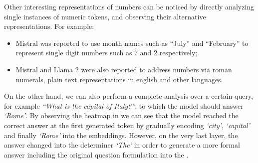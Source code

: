 
Other interesting representations of numbers can be noticed by directly analyzing single instances of numeric tokens, and observing their alternative representations.
For example:
\begin{itemize}
    \item Mistral was reported to use month names such as ``July'' and ``February'' to represent single digit numbers such as 7 and 2 respectively;
    \item Mistral and Llama 2 were also reported to address numbers via roman numerals, plain text representations in english and other languages.
\end{itemize}

\begin{figure}[t!]
\end{figure}

\begin{figure}[t!]
    \centering
    \quad
    \label{fig:exp_intravisto_4_C}
\end{figure}

On the other hand, we can also perform a complete analysis over a certain query, for example \emph{``What is the capital of Italy?''}, to which the model should answer \emph{`Rome'}.
By observing the heatmap in  we can see that the model reached the correct answer at the first generated token by gradually encoding \emph{`city'}, \emph{`capital'} and finally \emph{`Rome'} into the embeddings.
However, on the very last layer, the answer changed into the determiner \emph{`The'} in order to generate a more formal answer including the original question formulation into the .

\begin{figure}[t!]
    \centering
    \quad
    \label{fig:exp_intravisto_4_D}
\end{figure}

